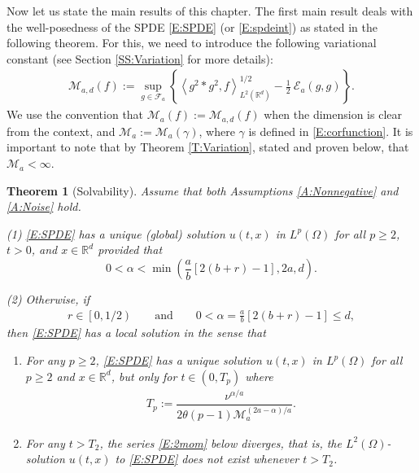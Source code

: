 \documentclass[12pt]{report}
\theoremstyle{plain}
\newtheorem{theorem}{Theorem}[section]
\theoremstyle{definition}
\numberwithin{equation}{section}
\newcommand{\R}{\mathbb{R}}
\begin{document}
Now let us state the main results of this chapter. The first main result deals with the well-posedness
of the SPDE \eqref{E:SPDE} (or \eqref{E:spdeint}) as stated in the following theorem. For this, we
need to introduce the following variational constant (see Section \ref{SS:Variation} for more
details):
\begin{align} \label{E:M1}
\mathcal{M}_{a,d}\left(f\right) := \sup_{g \in \mathcal{F}_a} \left\{ \left\langle g^2 * g^2, f \right\rangle^{1/2}_{L^2(\R^d)} - \frac{1}{2}\: \mathcal{E}_a(g,g) \right\}.
\end{align}
We use the convention that $\mathcal{M}_{a}\left(f\right) := \mathcal{M}_{a,d}\left(f\right)$ when
the dimension is clear from the context, and $\mathcal{M}_{a}:=\mathcal{M}_{a}(\gamma)$, where
$\gamma$ is defined in \eqref{E:corfunction}. It is important to note that by Theorem \ref{T:Variation}, stated and proven below, that $\mathcal{M}_a < \infty$.

\begin{theorem}[Solvability] \label{T:solvable}
	Assume that both Assumptions \ref{A:Nonnegative} and \ref{A:Noise} hold.
	
	\noindent (1) \eqref{E:SPDE} has a unique (global) solution $u(t,x)$ in $L^p(\Omega)$ for all $p \ge 2$,
	$t>0$, and $x \in \R^d$ provided that
	\begin{equation}
	\label{E:alpha}
	0< \alpha < \min\left( \frac{a}{b}\left[2(b+r)-1\right], 2a, d \right).
	\end{equation}
	
	\noindent (2) Otherwise, if
	\begin{align}
	\label{E:critical}
	r\in \left[0,1/2\right) \qquad \text{and} \qquad
	0<\alpha = \frac{a}{b}[2(b+r)-1] \le d,
	\end{align}
	then \eqref{E:SPDE} has a local solution in the sense that
	\begin{enumerate}
		\item[(2-i)] For any $p\ge 2$, \eqref{E:SPDE} has a unique solution $u(t,x)$ in $L^p(\Omega)$ for
		all $p \ge 2$ and $x \in \R^d$, but only for $t\in (0, T_p)$ where
		\begin{align}
		\label{E:Tp}
		T_p := \dfrac{\nu^{\alpha/a}}{2 \theta (p-1) \mathcal{M}_a^{(2a-\alpha)/a}}.
		\end{align}
		\item[(2-ii)] For any $t>T_2$, the series \eqref{E:2mom} below diverges, that is, the
		$L^2(\Omega)$-solution $u(t,x)$ to \eqref{E:SPDE} does not exist whenever $t>T_2$.
	\end{enumerate}
\end{theorem}
\end{document}

